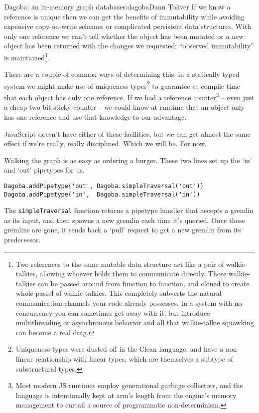 \begin{aosachapter}{Dagoba: an in-memory graph database}{s:dagoba}{Dann Toliver}
If we know a reference is unique then we can get the benefits of
immutability while avoiding expensive copy-on-write schemes or
complicated persistent data structures. With only one reference we can't
tell whether the object has been mutated or a new object has been
returned with the changes we requested: ``observed immutability'' is
maintained\footnote{Two references to the same mutable data structure
  act like a pair of walkie-talkies, allowing whoever holds them to
  communicate directly. Those walkie-talkies can be passed around from
  function to function, and cloned to create whole passel of
  walkie-talkies. This completely subverts the natural communication
  channels your code already possesses. In a system with no concurrency
  you can sometimes get away with it, but introduce multithreading or
  asynchronous behavior and all that walkie-talkie squawking can become
  a real drag.}.

There are a couple of common ways of determining this: in a statically
typed system we might make use of uniqueness types\footnote{Uniqueness
  types were dusted off in the Clean language, and have a non-linear
  relationship with linear types, which are themselves a subtype of
  substructural types.} to guarantee at compile time that each object
has only one reference. If we had a reference counter\footnote{Most
  modern JS runtimes employ generational garbage collectors, and the
  language is intentionally kept at arm's length from the engine's
  memory management to curtail a source of programmatic non-determinism.}
-- even just a cheap two-bit sticky counter -- we could know at runtime
that an object only has one reference and use that knowledge to our
advantage.

JavaScript doesn't have either of these facilities, but we can get
almost the same effect if we're really, really disciplined. Which we
will be. For now.

\label{in-n-out}

Walking the graph is as easy as ordering a burger. These two lines set
up the `in' and `out' pipetypes for us.

\begin{verbatim}
Dagoba.addPipetype('out', Dagoba.simpleTraversal('out'))
Dagoba.addPipetype('in',  Dagoba.simpleTraversal('in'))
\end{verbatim}

The \texttt{simpleTraversal} function returns a pipetype handler that
accepts a gremlin as its input, and then spawns a new gremlin each time
it's queried. Once those gremlins are gone, it sends back a `pull'
request to get a new gremlin from its predecessor.


\end{aosachapter}
